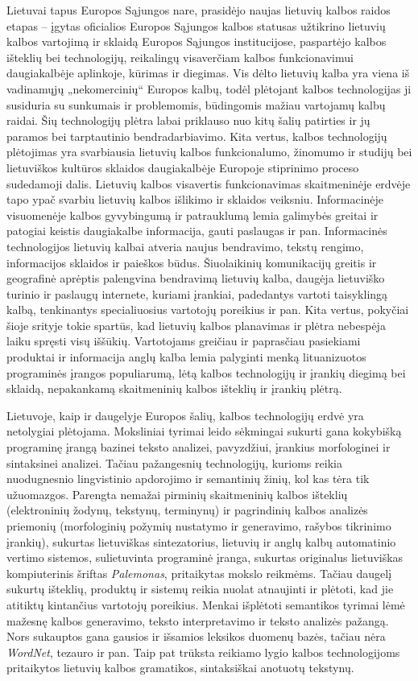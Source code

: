 \begin{multicols}{2}
Lietuvai tapus Europos Sąjungos nare, prasidėjo naujas lietuvių kalbos raidos etapas – įgytas oficialios Europos Sąjungos kalbos statusas užtikrino lietuvių kalbos vartojimą ir sklaidą Europos Sąjungos institucijose, paspartėjo kalbos išteklių bei technologijų, reikalingų visaverčiam kalbos funkcionavimui daugiakalbėje aplinkoje, kūrimas ir diegimas. Vis dėlto lietuvių kalba yra viena iš vadinamųjų „nekomercinių“ Europos kalbų, todėl plėtojant kalbos technologijas ji susiduria su sunkumais ir problemomis, būdingomis mažiau vartojamų kalbų   raidai. Šių technologijų plėtra labai priklauso nuo kitų šalių patirties ir jų paramos bei tarptautinio bendradarbiavimo. Kita vertus, kalbos technologijų plėtojimas yra svarbiausia lietuvių kalbos funkcionalumo, žinomumo ir studijų bei lietuviškos kultūros sklaidos daugiakalbėje Europoje stiprinimo proceso sudedamoji dalis. Lietuvių kalbos visavertis funkcionavimas skaitmeninėje erdvėje tapo ypač svarbiu lietuvių kalbos išlikimo ir sklaidos veiksniu. 
Informacinėje visuomenėje kalbos gyvybingumą ir patrauklumą lemia galimybės greitai ir patogiai keistis daugiakalbe informacija, gauti paslaugas ir pan.  Informacinės technologijos lietuvių kalbai atveria naujus bendravimo, tekstų rengimo, informacijos sklaidos ir paieškos būdus. Šiuolaikinių komunikacijų greitis ir geografinė aprėptis palengvina bendravimą lietuvių kalba, daugėja lietuviško turinio ir paslaugų internete, kuriami įrankiai, padedantys vartoti taisyklingą kalbą, tenkinantys specialiuosius vartotojų poreikius ir pan. Kita vertus, pokyčiai šioje srityje tokie spartūs, kad lietuvių kalbos planavimas ir plėtra nebespėja laiku spręsti visų iššūkių. Vartotojams greičiau ir paprasčiau pasiekiami produktai ir informacija anglų kalba lemia palyginti menką lituanizuotos programinės įrangos populiarumą, lėtą kalbos technologijų ir įrankių diegimą bei sklaidą, nepakankamą skaitmeninių kalbos išteklių ir įrankių plėtrą. 

Lietuvoje, kaip ir daugelyje Europos šalių, kalbos technologijų erdvė yra netolygiai plėtojama. Moksliniai tyrimai leido sėkmingai sukurti gana kokybišką programinę įrangą bazinei teksto analizei, pavyzdžiui, įrankius morfologinei ir sintaksinei analizei. Tačiau pažangesnių technologijų, kurioms reikia nuodugnesnio lingvistinio apdorojimo ir semantinių žinių, kol kas tėra tik užuomazgos. Parengta nemažai pirminių skaitmeninių kalbos išteklių (elektroninių žodynų, tekstynų, terminynų) ir pagrindinių kalbos analizės priemonių (morfologinių požymių nustatymo ir generavimo, rašybos tikrinimo įrankių), sukurtas lietuviškas sintezatorius, lietuvių ir anglų kalbų automatinio vertimo sistemos, sulietuvinta programinė įranga, sukurtas originalus lietuviškas kompiuterinis šriftas \textit{Palemonas}, pritaikytas mokslo reikmėms. Tačiau daugelį sukurtų išteklių, produktų ir sistemų reikia nuolat atnaujinti ir plėtoti, kad jie atitiktų kintančius vartotojų poreikius. Menkai išplėtoti semantikos tyrimai lėmė mažesnę kalbos generavimo, teksto interpretavimo ir teksto analizės pažangą. Nors sukauptos gana gausios ir išsamios leksikos duomenų bazės, tačiau nėra \textit{WordNet}, tezauro ir pan. Taip pat trūksta reikiamo lygio kalbos technologijoms pritaikytos lietuvių kalbos gramatikos, sintaksiškai anotuotų tekstynų.  


\end{multicols}
